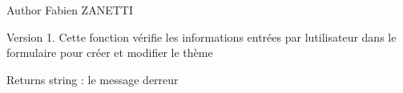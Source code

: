 \begin{DoxyAuthor}{Author}
Fabien Z\+A\+N\+E\+T\+T\+I 
\end{DoxyAuthor}
\begin{DoxyVersion}{Version}
1. Cette fonction vérifie les informations entrées par l\textquotesingle{}utilisateur dans le formulaire pour créer et modifier le thème 
\end{DoxyVersion}
\begin{DoxyReturn}{Returns}
string \+: le message d\textquotesingle{}erreur 
\end{DoxyReturn}
